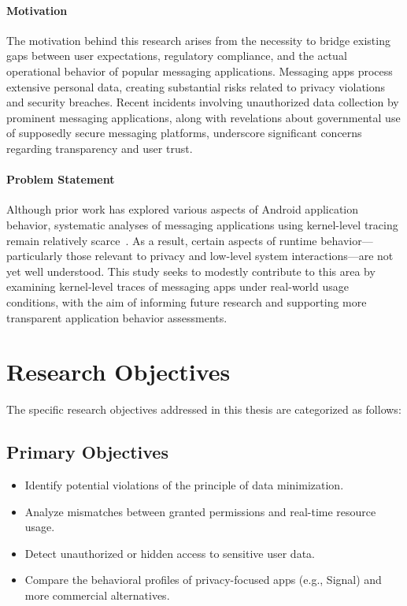 \documentclass[a4paper,12pt]{report}
\begin{document}
\paragraph{Motivation}
The motivation behind this research arises from the necessity to bridge existing gaps between user expectations, regulatory compliance, and the actual operational behavior of popular messaging applications. Messaging apps process extensive personal data, creating substantial risks related to privacy violations and security breaches. Recent incidents involving unauthorized data collection by prominent messaging applications, along with revelations about governmental use of supposedly secure messaging platforms, underscore significant concerns regarding transparency and user trust.

\paragraph{Problem Statement}
Although prior work has explored various aspects of Android application behavior, systematic analyses of messaging applications using kernel-level tracing remain relatively scarce~\cite{DynamicSecurityAnalysis2023}. As a result, certain aspects of runtime behavior—particularly those relevant to privacy and low-level system interactions—are not yet well understood. This study seeks to modestly contribute to this area by examining kernel-level traces of messaging apps under real-world usage conditions, with the aim of informing future research and supporting more transparent application behavior assessments.

\section{Research Objectives}
The specific research objectives addressed in this thesis are categorized as follows:

\subsection*{Primary Objectives}
\begin{itemize}
\item Identify potential violations of the principle of data minimization.
\item Analyze mismatches between granted permissions and real-time resource usage.
\item Detect unauthorized or hidden access to sensitive user data.
\item Compare the behavioral profiles of privacy-focused apps (e.g., Signal) and more commercial alternatives.
\end{itemize}
\end{document}
